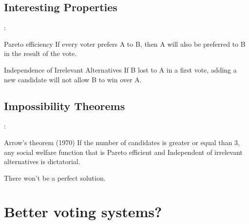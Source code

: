 \documentclass[utf8]{earlywinter}
\begin{document}
\subsection{Interesting Properties}
\begin{frame}{\secname: \subsecname}

  \begin{block}{Pareto efficiency}
    {If every voter prefers A to B, then A will also be preferred to B in the result of the vote.}
  \end{block}
  \vfill
  \begin{block}{Independence of Irrelevant Alternatives}
    {If B lost to A in a first vote, adding a new candidate will not allow B to win over A.}
  \end{block}
\end{frame}


\subsection{Impossibility Theorems}
\begin{frame}{\secname: \subsecname}

  \begin{block}{Arrow's theorem (1970)}
    If the number of candidates is greater or equal than 3, any social welfare function that is Pareto efficient and Independent of irrelevant alternatives is dictatorial.
  \end{block}
  \vfill
  \begin{alertblock}{There won't be a perfect solution.}
  \end{alertblock}

\end{frame}


 
\section[Solutions]{Better voting systems?}
\end{document}
